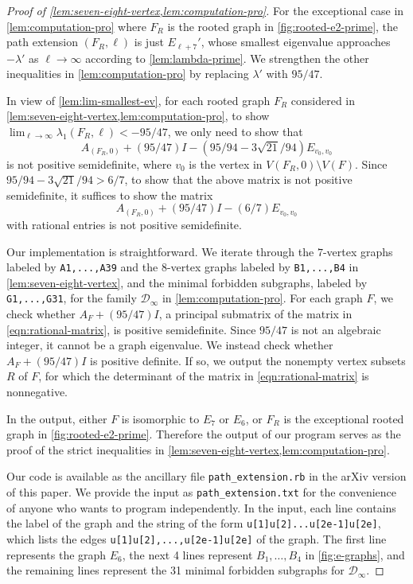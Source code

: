 \documentclass[11pt]{article}
\theoremstyle{definition}
\theoremstyle{remark}
\newcommand{\computer}{\tikz[scale=0.28, baseline=0.1ex, transform shape]{\draw[rounded corners=0.02] (0.15, 0.45) rectangle (0.85, 0.85) {};\draw[rounded corners=0.02] (0, 0.3) rectangle (1, 1) {};\draw[rounded corners=0.02] (0, 0) rectangle (1, 0.2) {};\draw (0.2,0.1) -- (0.3,0.1);\draw (0.5,0.1) -- (0.8,0.1);}}
\newenvironment{cproof}[1][Proof]{\begin{proof}[#1]\renewcommand*{\qedsymbol}{\(\computer\)}}{\end{proof}}
\newcommand{\la}{\lambda}
\newcommand{\D}{\mathcal{D}}
\begin{document}
\begin{cproof}[Proof of \cref{lem:seven-eight-vertex,lem:computation-pro}]
    For the exceptional case in \cref{lem:computation-pro} where $F_R$ is the rooted graph in \cref{fig:rooted-e2-prime}, the path extension $(F_R, \ell)$ is just $E_{\ell+7}'$, whose smallest eigenvalue approaches $-\la'$ as $\ell \to \infty$ according to \cref{lem:lambda-prime}. We strengthen the other inequalities in \cref{lem:computation-pro} by replacing $\la'$ with $95/47$.
    
    In view of \cref{lem:lim-smallest-ev}, for each rooted graph $F_R$ considered in \cref{lem:seven-eight-vertex,lem:computation-pro}, to show $\lim_{\ell \to \infty} \la_1(F_R, \ell) < -95/47$, we only need to show that
    \[
        A_{(F_R, 0)} + (95/47)I - (95/94-3\sqrt{21}/94)E_{v_0,v_0}
    \] is not positive semidefinite, where $v_0$ is the vertex in $V(F_R,0)\setminus V(F)$. Since $95/94-3\sqrt{21}/94 > 6/7$, to show that the above matrix is not positive semidefinite, it suffices to show the matrix
    \begin{equation} \label{eqn:rational-matrix}
        A_{(F_R, 0)} + (95/47)I - (6/7)E_{v_0,v_0}
    \end{equation}
    with rational entries is not positive semidefinite.
    
    Our implementation is straightforward. We iterate through the $7$-vertex graphs labeled by \texttt{A1,...,A39} and the $8$-vertex graphs labeled by \texttt{B1,...,B4} in \cref{lem:seven-eight-vertex}, and the minimal forbidden subgraphs, labeled by \texttt{G1,...,G31}, for the family $\D_\infty$ in \cref{lem:computation-pro}. For each graph $F$, we check whether $A_F + (95/47)I$, a principal submatrix of the matrix in \eqref{eqn:rational-matrix}, is positive semidefinite. Since $95/47$ is not an algebraic integer, it cannot be a graph eigenvalue. We instead check whether $A_F + (95/47)I$ is positive definite. If so, we output the nonempty vertex subsets $R$ of $F$, for which the determinant of the matrix in \eqref{eqn:rational-matrix} is nonnegative.
    
    In the output, either $F$ is isomorphic to $E_7$ or $E_6$, or $F_R$ is the exceptional rooted graph in \cref{fig:rooted-e2-prime}. Therefore the output of our program serves as the proof of the strict inequalities in \cref{lem:seven-eight-vertex,lem:computation-pro}.
    
    Our code is available as the ancillary file \texttt{path\_extension.rb} in the arXiv version of this paper. We provide the input as \texttt{path\_extension.txt} for the convenience of anyone who wants to program independently. In the input, each line contains the label of the graph and the string of the form \texttt{u[1]u[2]...u[2e-1]u[2e]}, which lists the edges \texttt{u[1]u[2],...,u[2e-1]u[2e]} of the graph. The first line represents the graph $E_6$, the next 4 lines represent $B_1, \dots, B_4$ in \cref{fig:e-graphs}, and the remaining lines represent the 31 minimal forbidden subgraphs for $\D_\infty$. 
\end{cproof}
\end{document}
